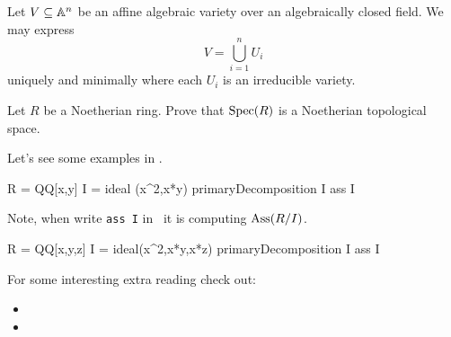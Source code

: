 \documentclass{ximera}
\begin{document}
\begin{theorem}
  Let $V\subseteq\mathbb A^n$ be an affine algebraic variety over an
  algebraically closed field. We may express
  \[
  V = \bigcup_{i=1}^n U_i
  \]
  uniquely and minimally where each $U_i$ is an irreducible variety.
\end{theorem}


\begin{exercise}
  Let $R$ be a Noetherian ring. Prove that $\operatorname{Spec}(R)$ is a Noetherian topological space. 
\end{exercise}


Let's see some examples in \macaulay.

\begin{macaulay2}
R = QQ[x,y]
I = ideal (x^2,x*y)
primaryDecomposition I
ass I
\end{macaulay2}

Note, when write \texttt{ass I} in \macaulay\, it is computing
$\operatorname{Ass}(R/I)$.

\begin{macaulay2}
R = QQ[x,y,z]
I = ideal(x^2,x*y,x*z)
primaryDecomposition I
ass I
\end{macaulay2}









For some interesting extra reading check out:
\begin{itemize}
\item {}

\item {}


\end{itemize}
\end{document}
